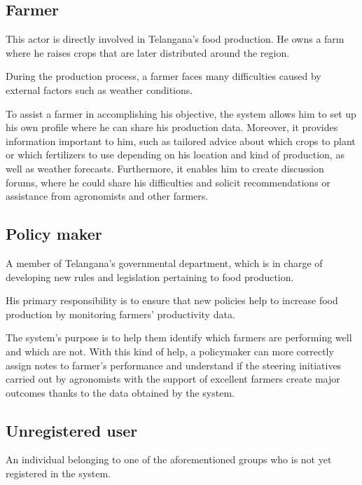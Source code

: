 \subsection{Farmer} \label{subsec:farmer}

This actor is directly involved in Telangana's food production. He owns a farm where he raises crops that are later distributed around the region.

During the production process, a farmer faces many difficulties caused by external factors such as weather conditions.

To assist a farmer in accomplishing his objective, the system allows him to set up his own profile where he can share his production data. Moreover, it provides information important to him, such as tailored advice about which crops to plant or which fertilizers to use depending on his location and kind of production, as well as weather forecasts. Furthermore, it enables him to create discussion forums, where he could share his difficulties and solicit recommendations or assistance from agronomists and other farmers.

\subsection{Policy maker} \label{subsec:policy_maker}

A member of Telangana's governmental department, which is in charge of developing new rules and legislation pertaining to food production.

His primary responsibility is to ensure that new policies help to increase food production by monitoring farmers' productivity data.

The system's purpose is to help them identify which farmers are performing well and which are not. With this kind of help, a policymaker can more correctly assign notes to farmer's performance and understand if the steering initiatives carried out by agronomists with the support of excellent farmers create major outcomes thanks to the data obtained by the system.

\subsection{Unregistered user}

An individual belonging to one of the aforementioned groups who is not yet registered in the system.

